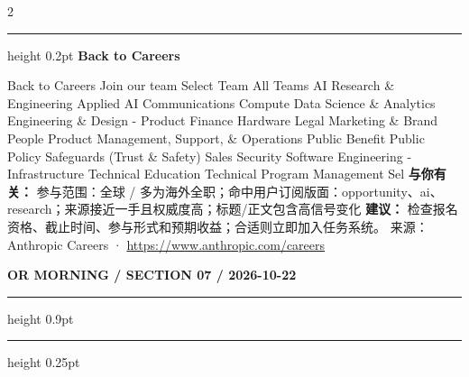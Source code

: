 \documentclass[10.5pt]{ctexart}
\begin{document}
\begin{multicols}{2}
\vspace{2mm}
\hrule height 0.2pt
\vspace{2mm}
{\large\bfseries Back to Careers}\par
Back to Careers Join our team Select Team All Teams AI Research \& Engineering Applied AI Communications Compute Data Science \& Analytics Engineering \& Design - Product Finance Hardware Legal Marketing \& Brand People Product Management, Support, \& Operations Public Benefit Public Policy Safeguards (Trust \& Safety) Sales Security Software Engineering - Infrastructure Technical Education Technical Program Management Sel
\textbf{与你有关：} 参与范围：全球 / 多为海外全职；命中用户订阅版面：opportunity、ai、research；来源接近一手且权威度高；标题/正文包含高信号变化
\textbf{建议：} 检查报名资格、截止时间、参与形式和预期收益；合适则立即加入任务系统。
{\footnotesize\color{ormuted} 来源：Anthropic Careers · \url{https://www.anthropic.com/careers}}
\end{multicols}
\newpage
{\small\bfseries OR MORNING / SECTION 07 / 2026-10-22}
\vspace{2mm}
\hrule height 0.9pt
\vspace{1.5mm}
\hrule height 0.25pt
\vspace{4mm}
\end{document}
